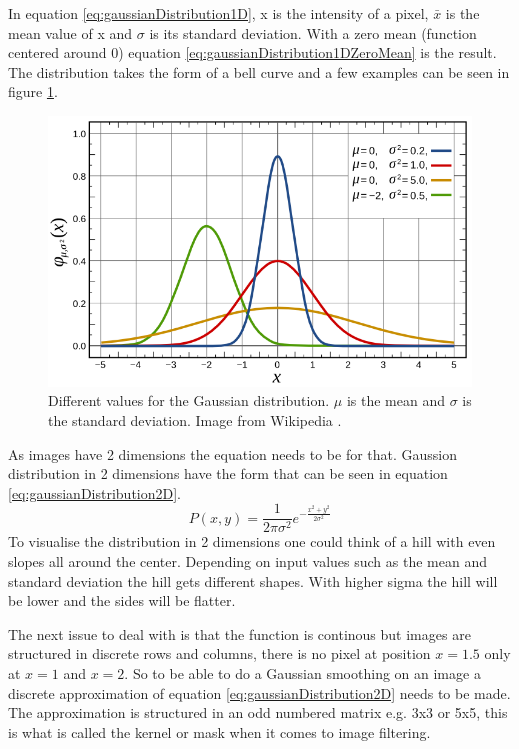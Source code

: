 In equation \ref{eq:gaussianDistribution1D}, x is the intensity of a pixel, \(\bar{x}\)
is the mean value of x and \(\sigma\) is its standard deviation. With a zero mean
(function centered around 0) equation \ref{eq:gaussianDistribution1DZeroMean} is the result.
The distribution takes the form of a bell curve and a few examples can be seen in figure
\ref{fig:gaussian1d}.
\begin{figure}[ht]
    \begin{minipage}[t]{\linewidth}
        \centering
        \includegraphics[width=\textwidth]{images/gaussian1d.png}
        \caption{Different values for the Gaussian distribution. \(\mu\) is the mean and \(\sigma\) is the standard deviation. Image from Wikipedia \cite{wiki:distributionGraph}.}
        \label{fig:gaussian1d}
    \end{minipage}
\end{figure}
As images have 2 dimensions the equation needs to be for that. Gaussion distribution in 2
dimensions have the form that can be seen in equation \ref{eq:gaussianDistribution2D}.
\begin{equation}
    \label{eq:gaussianDistribution2D}
    P(x,y) = \frac{1}{{ 2\pi \sigma^2}}e^{- \frac{x^2 + y^2}{2 \sigma^2}}
\end{equation}
To visualise the distribution in 2 dimensions one could think of a hill with even
slopes all around the center. Depending on input values such as the mean and
standard deviation the hill gets different shapes. With higher sigma the
hill will be lower and the sides will be flatter.

The next issue to deal with is that the function is continous but images are
structured in discrete rows and columns, there is no pixel at position \(x=1.5\) only
at \(x=1\) and \(x=2\). So to be able to do a Gaussian smoothing on an image a
discrete approximation of equation \ref{eq:gaussianDistribution2D} needs to be made.
The approximation is structured in an odd numbered matrix e.g. 3x3 or 5x5, this
is what is called the kernel or mask when it comes to image filtering.

